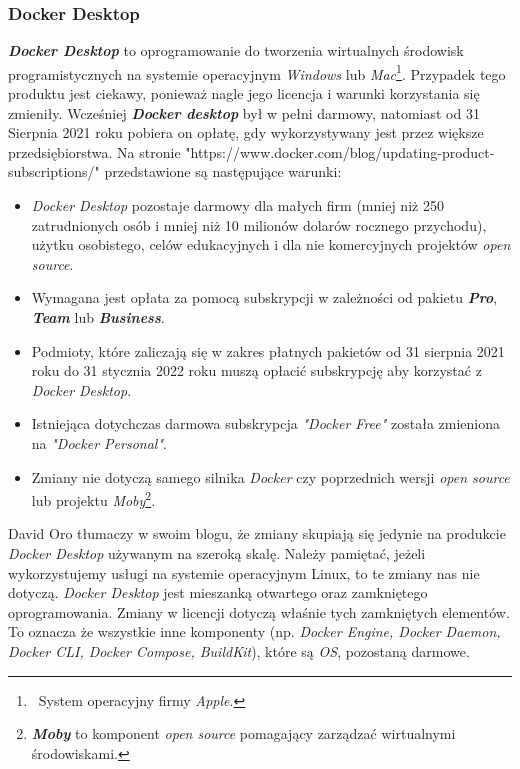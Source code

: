 \documentclass{article}
\begin{document}
\subsubsection{Docker Desktop}

\hspace{4mm} \textbf{\emph{Docker Desktop}} to oprogramowanie do tworzenia wirtualnych środowisk programistycznych na systemie operacyjnym \emph{Windows} lub \emph{Mac}\footnote{\, System operacyjny firmy \emph{Apple}.}. Przypadek tego produktu jest ciekawy, ponieważ nagle jego licencja i warunki korzystania się zmieniły. Wcześniej \textbf{\emph{Docker desktop}} był w pełni darmowy, natomiast od 31 Sierpnia 2021 roku pobiera on opłatę, gdy wykorzystywany jest przez większe przedsiębiorstwa. Na stronie "https://www.docker.com/blog/updating-product-subscriptions/" przedstawione są następujące warunki\cite{docker.update}:
\begin{itemize}
    \item \emph{Docker Desktop} pozostaje darmowy dla małych firm (mniej niż 250 zatrudnionych osób i mniej niż 10 milionów dolarów rocznego przychodu), użytku osobistego, celów edukacyjnych i dla nie komercyjnych projektów \emph{open source}.
    \item Wymagana jest opłata za pomocą subskrypcji w zależności od pakietu \textbf{\emph{Pro}}, \textbf{\emph{Team}} lub \textbf{\emph{Business}}.
    \item Podmioty, które zaliczają się w zakres płatnych pakietów od 31 sierpnia 2021 roku do 31 stycznia 2022 roku muszą opłacić subskrypcję aby korzystać z \emph{Docker Desktop}.
    \item Istniejąca dotychczas darmowa subskrypcja \emph{"Docker Free"} została zmieniona na \emph{"Docker Personal"}.
    \item Zmiany nie dotyczą samego silnika \emph{Docker} czy poprzednich wersji \emph{open source} lub projektu \emph{Moby}\footnote{\textbf{\emph{Moby}} to komponent \emph{open source} pomagający zarządzać wirtualnymi środowiskami.}.
\end{itemize}

David Oro tłumaczy w swoim blogu, że zmiany skupiają się jedynie na produkcie \emph{Docker Desktop} używanym na szeroką skalę. Należy pamiętać, jeżeli wykorzystujemy usługi na systemie operacyjnym Linux, to te zmiany nas nie dotyczą. \emph{Docker Desktop} jest mieszanką otwartego oraz zamkniętego oprogramowania. Zmiany w licencji dotyczą właśnie tych zamkniętych elementów. To oznacza że wszystkie inne komponenty (np. \emph{Docker Engine, Docker Daemon, Docker CLI, Docker Compose, BuildKit}), które są \emph{OS}, pozostaną darmowe\cite{docker.oro}.
\end{document}
